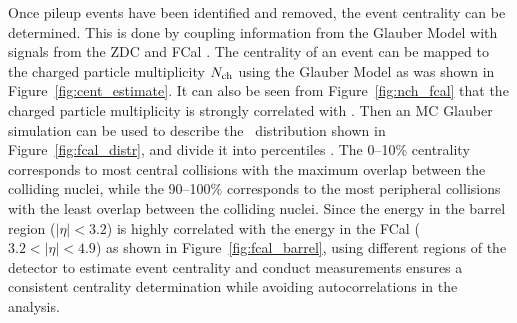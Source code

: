 Once pileup events have been identified and removed, the event centrality can be determined.
This is done by coupling information from the Glauber Model with signals from the ZDC and FCal \cite{ATLAS:2016tor, Aaboud:2018ves}.
The centrality of an event can be mapped to the charged particle multiplicity $N_{\rm ch}$ using the Glauber Model as was shown in Figure~\ref{fig:cent_estimate}.
It can also be seen from Figure~\ref{fig:nch_fcal} that the charged particle multiplicity is strongly correlated with \ETfcal.
Then an MC Glauber simulation can be used to describe the \ETfcal\ distribution shown in Figure~\ref{fig:fcal_distr}, and divide it into percentiles \cite{ATLAS:2011ah}.
The 0--10\% centrality corresponds to most central collisions with the maximum overlap between the colliding nuclei, while the 90--100\% corresponds to the most peripheral collisions with the least overlap between the colliding nuclei.
Since the energy in the barrel region ($|\eta| < 3.2$) is highly correlated with the energy in the FCal ( $3.2 < |\eta| < 4.9$) as shown in Figure~\ref{fig:fcal_barrel}, using different regions of the detector to estimate event centrality and conduct measurements ensures a consistent centrality determination while avoiding autocorrelations in the analysis.



